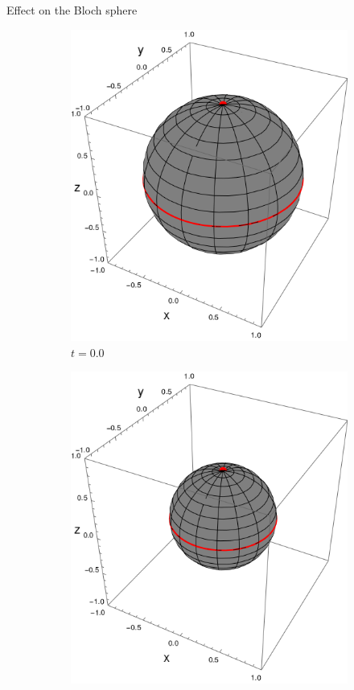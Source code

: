 \begin{frame}{Effect on the Bloch sphere}
    \begin{figure}[h!]
        \centering
        \begin{subfigure}{0.32\textwidth}
            \centering
            \includegraphics[width=0.9\linewidth]{figures/sphere_swapcontraction_t=0.0_z=0.9_p=0.9.png}
            \caption{$t=0.0$}
        \end{subfigure}%
        \begin{subfigure}{0.32\textwidth}
            \centering
            \includegraphics[width=0.9\linewidth]{figures/sphere_swapcontraction_t=0.5_z=0.9_p=0.9.png}

\end{subfigure}
\end{figure}
\end{frame}
